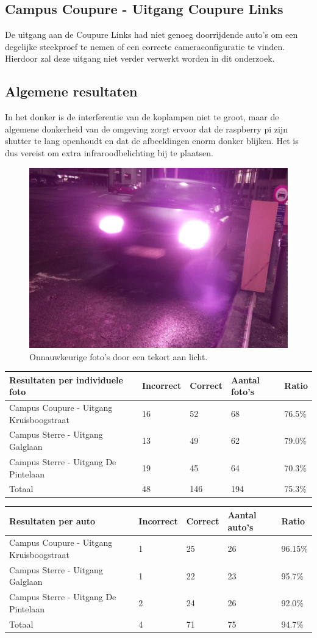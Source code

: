 \subsection{Campus Coupure - Uitgang Coupure Links}
De uitgang aan de Coupure Links had niet genoeg doorrijdende auto's om een degelijke steekproef te nemen of een correcte cameraconfiguratie te vinden. Hierdoor zal deze uitgang niet verder verwerkt worden in dit onderzoek.

\subsection{Algemene resultaten}
In het donker is de interferentie van de koplampen niet te groot, maar de algemene donkerheid van de omgeving zorgt ervoor dat de raspberry pi zijn shutter te lang openhoudt en dat de afbeeldingen enorm donker blijken. Het is dus vereist om extra infraroodbelichting bij te plaatsen.
\begin{figure}[h!]
	\centering
	\includegraphics[width=0.5\linewidth]{img/nacht-coupure.jpg}
	\caption{Onnauwkeurige foto's door een tekort aan licht.}
	\label{SterreDonker}
\end{figure}

\begin{table}[h!]
	\centering
	\begin{tabular}{l|l|l|l|l}
		\textbf{Resultaten per individuele foto}	& \textbf{Incorrect}	& \textbf{Correct} & \textbf{Aantal foto's} & \textbf{Ratio} \\ \hline
		Campus Coupure - Uitgang Kruisboogstraat & 16 & 52 & 68 & 76.5\% \\
		Campus Sterre - Uitgang Galglaan 		 & 13 & 49 & 62 & 79.0\%\\
		Campus Sterre - Uitgang De Pintelaan	 & 19 & 45 & 64 & 70.3\%\\ \hline
		Totaal 									 & 48 & 146 & 194 & 75.3\%
	\end{tabular}
\end{table}

\begin{table}[h!]
	\centering
	\begin{tabular}{l|l|l|l|l}
		\textbf{Resultaten per auto} & \textbf{Incorrect}	& \textbf{Correct} & \textbf{Aantal auto's} & \textbf{Ratio} \\ \hline
		Campus Coupure - Uitgang Kruisboogstraat& 1 & 25  & 26 & 96.15\% \\
		Campus Sterre - Uitgang Galglaan		& 1 & 22  & 23 & 95.7\%\\
		Campus Sterre - Uitgang De Pintelaan	& 2 & 24  & 26 & 92.0\%\\ \hline
		Totaal 									& 4 & 71 & 75 & 94.7\%
	\end{tabular}
\end{table}



